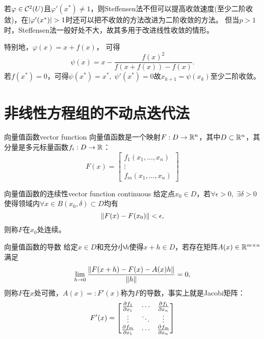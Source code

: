 \begin{remark}
    若$\varphi\in\mathcal C^2(U)$且$\varphi'(x^*)\neq 1$，则Steffensen法不但可以提高收敛速度(至少二阶收敛)，在$\left\lvert\varphi'(x^*)\right\rvert>1$时还可以把不收敛的方法改进为二阶收敛的方法。
    但当$p>1$时，Steffensen法一般好处不大，故其多用于改进线性收敛的情形。
\end{remark}

\begin{example}
    {}{}
    特别地，$\varphi(x)=x+f(x)$，
    可得
    \begin{equation}
        \psi(x)=x-\frac{f(x)^2}{f(x+f(x))-f(x)}.
    \end{equation}
    若$f(x^*)=0$，可得$\psi(x^*)=x^*,\;\psi'(x^*)=0$故$x_{k+1}=\psi(x_k)$至少二阶收敛。
\end{example}

\section{非线性方程组的不动点迭代法}

\begin{definition}
    {向量值函数}{vector function}
    向量值函数是一个映射$F:D\to\mathbb R^n$，其中$D\subset\mathbb R^n$，其分量是多元标量函数$f_i:D\to\mathbb R$：
    \begin{equation}
        F(x)=\begin{bmatrix}
            f_1(x_1,\ldots,x_n)\\\vdots\\f_m(x_1,\ldots,x_n)
        \end{bmatrix}
    \end{equation}
\end{definition}

\begin{definition}
    {向量值函数的连续性}{vector function continuous}
    给定点$x_0\in D$，若$\forall\epsilon>0,\;\exists\delta>0$使得领域内$\forall x\in B(x_0,\delta)\subset D$均有
    \[
        \left\lVert F(x)-F(x_0)\right\rVert<\epsilon,
    \]
    则称$F$在$x_0$处连续。
\end{definition}

\begin{definition}
    {向量值函数的导数}{}
    给定$x\in D$和充分小$h$使得$x+h\in D$，若存在矩阵$A(x)\in\mathbb R^{m\times n}$满足 
    \begin{equation}
        \lim_{h\to 0}\frac{\left\lVert F(x+h)-F(x)-A(x)h\right\rVert}{\left\lVert h\right\rVert}=0,
    \end{equation}
    则称$F$在$x$处可微，$A(x)=:F'(x)$称为$F$的导数，事实上就是Jacobi矩阵：
    \begin{equation}
        F'(x)=\begin{bmatrix}
            \frac{\partial^{{}}f_1}{\partial{x_1}^{{}}}&\cdots&\frac{\partial^{{}}f_1}{\partial{x_n}^{{}}}\\
            \vdots&\ddots&\vdots\\
            \frac{\partial^{{}}f_m}{\partial{x_1}^{{}}}&\cdots&\frac{\partial^{{}}f_m}{\partial{x_n}^{{}}}
        \end{bmatrix}
    \end{equation}
\end{definition}

